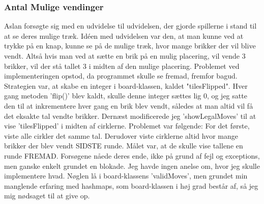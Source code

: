 \subsubsection{Antal Mulige vendinger}\label{AMV}
Aslan forsøgte sig med en udvidelse til udvidelsen, der gjorde spillerne i stand til at se deres mulige træk. Idéen med udvidelsen var den, at man kunne ved at trykke på en knap, kunne se på de mulige træk, hvor mange brikker der vil blive vendt. Altså hvis man ved at sætte en brik på en mulig placering, vil vende 3 brikker, vil der stå tallet 3 i midten af den mulige placering. Problemet ved implementeringen opstod, da programmet skulle se fremad, fremfor bagud. Strategien var, at skabe en integer i board-klassen, kaldet "tilesFlipped". Hver gang metoden 'flip()' blev kaldt, skulle denne integer sættes lig 0, og jeg satte den til at inkrementere hver gang en brik blev vendt, således at man altid vil få det eksakte tal vendte brikker. Dernæst modificerede jeg 'showLegalMoves' til at vise 'tilesFlipped' i midten af cirklerne. Problemet var følgende: For det første, viste alle cirkler det samme tal. Derudover viste cirklerne altid hvor mange brikker der blev vendt SIDSTE runde. Målet var, at de skulle vise tallene en runde FREMAD. Forsøgene nåede deres ende, ikke på grund af fejl og exceptions, men ganske enkelt grundet en blokade. Jeg havde ingen anelse om, hvor jeg skulle implementere hvad. Nøglen lå i board-klassens 'validMoves', men grundet min manglende erfaring med hashmaps, som board-klassen i høj grad består af, så jeg mig nødsaget til at give op. 
